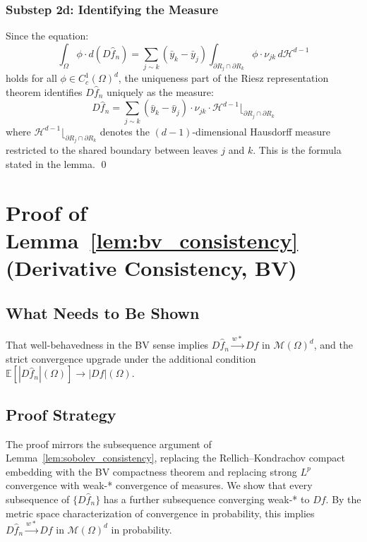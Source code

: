 \documentclass[12pt]{article}
\newcommand{\E}{\mathbb{E}}
\newcommand{\cM}{\mathcal{M}(\Omega)^d}
\newcommand{\fn}{\hat{f}_n}
\begin{document}
	\subsubsection*{Substep 2d: Identifying the Measure}
	
	Since the equation:
	\begin{equation}
		\int_\Omega \phi \cdot d(D\fn)
		= \sum_{j \sim k} (\bar{y}_k - \bar{y}_j)
		\int_{\partial R_j \cap \partial R_k} \phi \cdot \nu_{jk}
		\, d\mathcal{H}^{d-1}
	\end{equation}
	holds for all $\phi \in C_c^1(\Omega)^d$, the uniqueness part of the Riesz
	representation theorem \citep[Theorem~1.38]{evans2015measure} identifies
	$D\fn$ uniquely as the measure:
	\begin{equation}
		D\fn = \sum_{j \sim k} (\bar{y}_k - \bar{y}_j) \cdot \nu_{jk} \cdot
		\mathcal{H}^{d-1}\lfloor_{\partial R_j \cap \partial R_k}
	\end{equation}
	where $\mathcal{H}^{d-1}\lfloor_{\partial R_j \cap \partial R_k}$ denotes
	the $(d-1)$-dimensional Hausdorff measure restricted to the shared boundary
	between leaves $j$ and $k$. This is the formula stated in the lemma.
	\qed
	
	\section{Proof of Lemma~\ref{lem:bv_consistency}
		(Derivative Consistency, BV)}
	\label{app:lem_bv_consistency}
	
	\subsection{What Needs to Be Shown}
	
	That well-behavedness in the BV sense implies $D\fn \xrightarrow{w*} Df$
	in $\cM$, and the strict convergence upgrade under the additional condition
	$\E[|D\fn|(\Omega)] \to |Df|(\Omega)$.
	
	\subsection{Proof Strategy}
	
	The proof mirrors the subsequence argument of
	Lemma~\ref{lem:sobolev_consistency}, replacing the Rellich--Kondrachov
	compact embedding with the BV compactness theorem and replacing strong $L^p$
	convergence with weak-* convergence of measures. We show that every
	subsequence of $\{D\fn\}$ has a further subsequence converging weak-* to
	$Df$. By the metric space characterization of convergence in probability,
	this implies $D\fn \xrightarrow{w*} Df$ in $\cM$ in probability.
	
\end{document}
